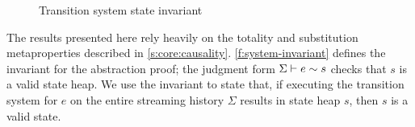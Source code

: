 \documentclass[a4paper,UKenglish,cleveref, autoref, thm-restate,anonymous]{lipics-v2021}
\begin{document}
\begin{figure}[t]
  \begin{mathpar}
  \end{mathpar}
  \begin{mathpar}








  \end{mathpar}

  \caption{Transition system state invariant}
  \label{f:system-invariant}
\end{figure} 
The results presented here rely heavily on the totality and substitution metaproperties described in \autoref{s:core:causality}.
\autoref{f:system-invariant} defines the invariant for the abstraction proof; the judgment form $\sysinv{\Sigma}{e}{s}$ checks that $s$ is a valid state heap.
We use the invariant to state that, if executing the transition system for $e$ on the entire streaming history $\Sigma$ results in state heap $s$, then $s$ is a valid state.
\end{document}
